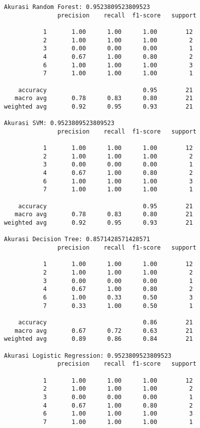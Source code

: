 \documentclass[
  letterpaper,
]{krantz}
\begin{document}
\begin{verbatim}
Akurasi Random Forest: 0.9523809523809523 
               precision    recall  f1-score   support

           1       1.00      1.00      1.00        12
           2       1.00      1.00      1.00         2
           3       0.00      0.00      0.00         1
           4       0.67      1.00      0.80         2
           6       1.00      1.00      1.00         3
           7       1.00      1.00      1.00         1

    accuracy                           0.95        21
   macro avg       0.78      0.83      0.80        21
weighted avg       0.92      0.95      0.93        21

Akurasi SVM: 0.9523809523809523 
               precision    recall  f1-score   support

           1       1.00      1.00      1.00        12
           2       1.00      1.00      1.00         2
           3       0.00      0.00      0.00         1
           4       0.67      1.00      0.80         2
           6       1.00      1.00      1.00         3
           7       1.00      1.00      1.00         1

    accuracy                           0.95        21
   macro avg       0.78      0.83      0.80        21
weighted avg       0.92      0.95      0.93        21

Akurasi Decision Tree: 0.8571428571428571 
               precision    recall  f1-score   support

           1       1.00      1.00      1.00        12
           2       1.00      1.00      1.00         2
           3       0.00      0.00      0.00         1
           4       0.67      1.00      0.80         2
           6       1.00      0.33      0.50         3
           7       0.33      1.00      0.50         1

    accuracy                           0.86        21
   macro avg       0.67      0.72      0.63        21
weighted avg       0.89      0.86      0.84        21

Akurasi Logistic Regression: 0.9523809523809523 
               precision    recall  f1-score   support

           1       1.00      1.00      1.00        12
           2       1.00      1.00      1.00         2
           3       0.00      0.00      0.00         1
           4       0.67      1.00      0.80         2
           6       1.00      1.00      1.00         3
           7       1.00      1.00      1.00         1


\end{verbatim}
\end{document}
